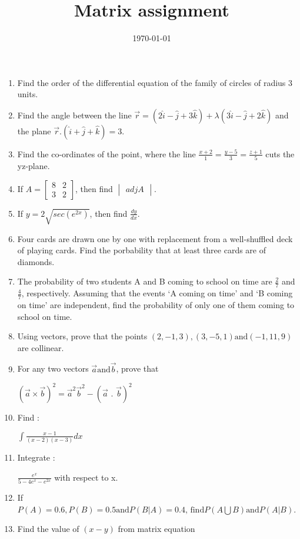 \documentclass[12pt,-letter paper]{article}
\title{Matrix assignment}
\date{\today}
\providecommand{\brak}[1]{\ensuremath{\left (#1\right)}}
\theoremstyle{remark}
\begin{document}
\begin{enumerate}   
	\item   Find the order of the differential equation of the family of circles of radius 3 units.
	\item Find the angle between the line $\overrightarrow{r} = \brak{2\hat{i} - \hat{j} + 3\hat{k}} + \lambda\brak{3\hat{i} - \hat{j} + 2\hat{k}}$ and the plane $\overrightarrow{r} . \brak{\hat{i} + \hat{j} + \hat{k}} = 3$.
	\item Find the co-ordinates of the point, where the line $\frac{x+2}{1} = \frac{y-5}{3} = \frac{z+1}{5}$ cuts the yz-plane.
	\item If $A = \begin{bmatrix}
			8 & 2\\
			3 & 2
	\end{bmatrix}$, then find $\begin{vmatrix}
		adj A
	\end{vmatrix}$.
\item If $y = 2\sqrt{sec\brak{e^{2x}}}$, then find $\frac{dy}{dx}$.
\item Four cards are drawn one by one with replacement from a well-shuffled deck of playing cards. Find the porbability that at least three cards are of diamonds.
\item The probability of two students A and B coming to school on time are $\frac{2}{7}$ and $\frac{4}{7}$, respectively. Assuming that the events `A coming on time' and `B coming on time' are independent, find the probability of only one of them coming to school on time. 
\item Using vectors, prove that the points $\brak{2, -1, 3}, \brak{3, -5, 1} \text{and} \brak{-1, 11, 9}$ are collinear.
\item  For any two vectors $\overrightarrow{a} \text{and} \overrightarrow{b}$, prove that 

	                             ${\brak{\overrightarrow{a} \times \overrightarrow{b}}}^{2} = {\overrightarrow{a}}^{2}  {\overrightarrow{b}}^{2} - {\brak{\overrightarrow{a}\text{ . } \overrightarrow{b}}}^{2}$
	\item Find :

		                   $\int\frac{x - 1}{\brak{x - 2}\brak{x - 3}}dx$
\item  Integrate :


	$\frac{e^x}{5 - 4e^x - e^{2x}}$ with respect to x.
\item If $P\brak{A} = 0.6, P\brak{B} = 0.5 \text{and} P\brak{B|A} = 0.4\text{, find} P\brak{A \bigcup B} \text{and} P\brak{A|B}$.
\item  Find the value of \brak{x - y} from matrix equation



\end{enumerate}
\end{document}
